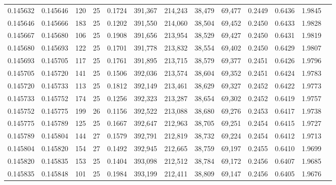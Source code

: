 \begin{tabular}{rrrrrrrrrrrrr}
0.145632 & 0.145646 &   120 &  25 &                                     0.1724 & 391,367 & 214,243 &  38,479 &  69,477 & 0.2449 & 0.6436 & 1.9845 \\
0.145646 & 0.145666 &   183 &  25 &                                     0.1202 & 391,550 & 214,060 &  38,504 &  69,452 & 0.2450 & 0.6433 & 1.9828 \\
0.145667 & 0.145680 &   106 &  25 &                                     0.1908 & 391,656 & 213,954 &  38,529 &  69,427 & 0.2450 & 0.6431 & 1.9819 \\
0.145680 & 0.145693 &   122 &  25 &                                     0.1701 & 391,778 & 213,832 &  38,554 &  69,402 & 0.2450 & 0.6429 & 1.9807 \\
0.145693 & 0.145705 &   117 &  25 &                                     0.1761 & 391,895 & 213,715 &  38,579 &  69,377 & 0.2451 & 0.6426 & 1.9796 \\
0.145705 & 0.145720 &   141 &  25 &                                     0.1506 & 392,036 & 213,574 &  38,604 &  69,352 & 0.2451 & 0.6424 & 1.9783 \\
0.145720 & 0.145733 &   113 &  25 &                                     0.1812 & 392,149 & 213,461 &  38,629 &  69,327 & 0.2452 & 0.6422 & 1.9773 \\
0.145733 & 0.145752 &   174 &  25 &                                     0.1256 & 392,323 & 213,287 &  38,654 &  69,302 & 0.2452 & 0.6419 & 1.9757 \\
0.145752 & 0.145775 &   199 &  26 &                                     0.1156 & 392,522 & 213,088 &  38,680 &  69,276 & 0.2453 & 0.6417 & 1.9738 \\
0.145775 & 0.145789 &   125 &  25 &                                     0.1667 & 392,647 & 212,963 &  38,705 &  69,251 & 0.2454 & 0.6415 & 1.9727 \\
0.145789 & 0.145804 &   144 &  27 &                                     0.1579 & 392,791 & 212,819 &  38,732 &  69,224 & 0.2454 & 0.6412 & 1.9713 \\
0.145804 & 0.145820 &   154 &  27 &                                     0.1492 & 392,945 & 212,665 &  38,759 &  69,197 & 0.2455 & 0.6410 & 1.9699 \\
0.145820 & 0.145835 &   153 &  25 &                                     0.1404 & 393,098 & 212,512 &  38,784 &  69,172 & 0.2456 & 0.6407 & 1.9685 \\
0.145835 & 0.145848 &   101 &  25 &                                     0.1984 & 393,199 & 212,411 &  38,809 &  69,147 & 0.2456 & 0.6405 & 1.9676 \\

\end{tabular}
